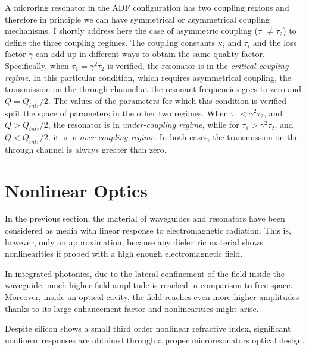 A microring resonator in the \ac{ADF} configuration has two coupling regions and therefore in principle we can have symmetrical or asymmetrical coupling mechanisms.
I shortly address here the case of asymmetric coupling ($\tau_1 \neq \tau_2$) to define the three coupling regimes.
The coupling constants $\kappa_i$ and $\tau_i$ and the loss factor $\gamma$ can add up in different ways to obtain the same quality factor.
Specifically, when $\tau_1=\gamma^2\tau_2$ is verified, the resonator is in the \textit{critical-coupling regime}.
In this particular condition, which requires asymmetrical coupling, the transmission on the through channel at the resonant frequencies goes to zero and $Q = Q_{intr}/2$.
The values of the parameters for which this condition is verified split the space of parameters in the other two regimes.
When $\tau_1<\gamma^2\tau_2$, and $Q > Q_{intr}/2$, the resonator is in \textit{under-coupling regime}, while for $\tau_1>\gamma^2\tau_2$, and $Q < Q_{intr}/2$, it is in \textit{over-coupling regime}.
In both cases, the transmission on the through channel is always greater than zero.

\clearpage
\section{Nonlinear Optics}
\label{sec:Nonlinear_Optics}
In the previous section, the material of waveguides and resonators have been considered as media with linear response to electromagnetic radiation.
This is, however, only an approximation, because any dielectric material shows nonlinearities if probed with a high enough electromagnetic field.

In integrated photonics, due to the lateral confinement of the field inside the waveguide, much higher field amplitude is reached in comparison to free space.
Moreover, inside an optical cavity, the field reaches even more higher amplitudes thanks to its large enhancement factor and nonlinearities might arise.

Despite silicon shows a small third order nonlinear refractive index, significant nonlinear responses are obtained through a proper microresonators optical design.


